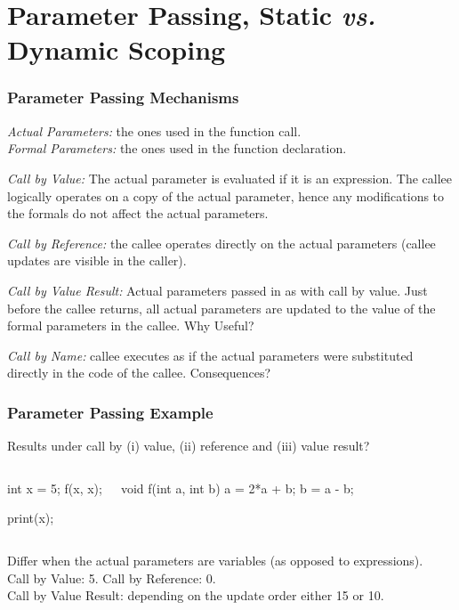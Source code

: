\documentclass{beamer}
\newcommand{\emp}[1]{\textcolor{DikuRed}{ #1}}
\begin{document}
\section{Parameter Passing, Static {\em vs.} Dynamic Scoping}

\begin{frame}[fragile]
	\tableofcontents[currentsection]
\end{frame}

\begin{frame}
\frametitle{Parameter Passing Mechanisms}

{\em Actual Parameters:} the ones used in the function call.\\\smallskip
{\em Formal Parameters:} the ones used in the function declaration.\bigskip

{\em Call by Value:} The actual parameter is evaluated if it is an expression.
The callee logically operates on a copy of the actual parameter, hence
any modifications to the formals do not affect the actual parameters.\bigskip

{\em Call by Reference:} the callee operates directly on the actual parameters 
(callee updates are visible in the caller).\bigskip

{\em Call by Value Result:} Actual parameters passed in as with call by
value. Just before the callee returns, all actual parameters are updated
to the value of the formal parameters in the callee. \emp{Why Useful?}\bigskip

{\em Call by Name:} callee executes as if the actual parameters were
substituted directly in the code of the callee. \emp{Consequences?}

\end{frame}



\begin{frame}[fragile,t]
   \frametitle{Parameter Passing Example}


\begin{block}{Results under call by (i) value, (ii) reference and (iii) value result? }
\begin{columns}
\begin{colorcode}[fontsize=\scriptsize]
int x = 5;
f(x, x);

print(x);
\end{colorcode} 
\begin{colorcode}[fontsize=\scriptsize]
void f(int a, int b) {
    a = 2*a + b;
    b =   a - b;
}
\end{colorcode}
\end{columns}
\end{block}

\smallskip
Differ when the actual parameters are variables (as opposed to expressions).\\
Call by Value: 5. Call by Reference: 0.\\
Call by Value Result: depending on the update order either 15 or 10.
\smallskip

\end{frame}
\end{document}
